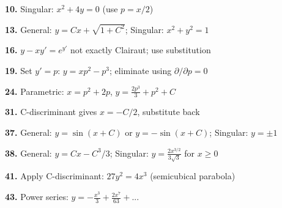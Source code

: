 \documentclass[12pt]{article}
\begin{document}
\textbf{10.} Singular: $x^2 + 4y = 0$ (use $p = x/2$)

\textbf{13.} General: $y = Cx + \sqrt{1 + C^2}$; Singular: $x^2 + y^2 = 1$

\textbf{16.} $y - xy' = e^{y'}$ not exactly Clairaut; use substitution

\textbf{19.} Set $y' = p$: $y = xp^2 - p^3$; eliminate using $\partial/\partial p = 0$

\textbf{24.} Parametric: $x = p^2 + 2p$, $y = \frac{2p^3}{3} + p^2 + C$

\textbf{31.} C-discriminant gives $x = -C/2$, substitute back

\textbf{37.} General: $y = \sin(x + C)$ or $y = -\sin(x + C)$; Singular: $y = \pm 1$

\textbf{38.} General: $y = Cx - C^3/3$; Singular: $y = \frac{2x^{3/2}}{3\sqrt{3}}$ for $x \geq 0$

\textbf{41.} Apply C-discriminant: $27y^2 = 4x^3$ (semicubical parabola)

\textbf{43.} Power series: $y = -\frac{x^3}{3} + \frac{2x^7}{63} + ...$
\end{document}
